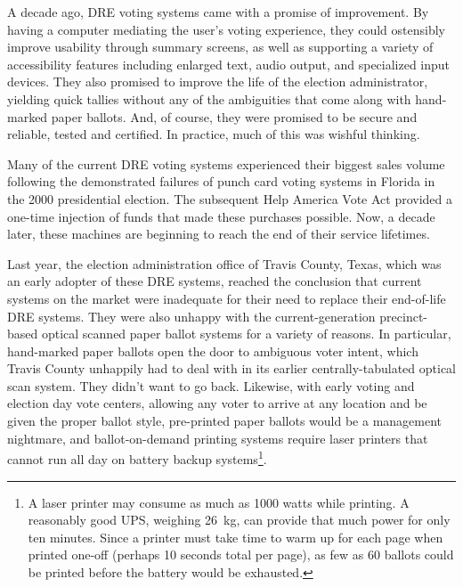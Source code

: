\label{sec:intro}

A decade ago, DRE voting systems came with a promise of improvement. By having a
computer mediating the user's voting experience, they could ostensibly
improve usability through summary screens, as well as supporting a
variety of accessibility features including enlarged text, audio
output, and specialized input devices. They also promised to improve
the life of the election administrator, yielding quick tallies without
any of the ambiguities that come along with hand-marked paper ballots.
And, of course, they were promised to be secure and reliable, tested
and certified. In practice, much of this was wishful thinking.

Many of the current DRE voting systems experienced their biggest sales
volume following the demonstrated failures of punch card voting
systems in Florida in the 2000 presidential election. The subsequent Help America Vote Act
provided a one-time injection of funds that made these purchases
possible. Now, a decade later, these machines are beginning to reach the end of
their service lifetimes. 

Last year, the election administration office of Travis County, Texas, which was an
early adopter of these DRE systems, reached the conclusion that current
systems on the market were inadequate for their need to replace their
end-of-life DRE systems. They were also unhappy with the
current-generation precinct-based optical scanned paper ballot systems
for a variety of reasons. In particular, hand-marked paper ballots
open the door to ambiguous voter intent, which Travis County unhappily
had to deal with in its earlier centrally-tabulated optical scan
system. They didn't want to go back. Likewise, with early
voting and election day vote centers, allowing any voter to arrive at
any location and be given the proper ballot style, pre-printed paper ballots would
be a management nightmare, and ballot-on-demand printing systems
require laser printers that cannot run all day on battery backup
systems\footnote{A laser printer may consume as much as 1000 watts
  while printing. A reasonably good UPS, weighing 26~kg, can provide
  that much power for only ten minutes. Since a printer must take time
  to warm up for each page when printed one-off (perhaps 10
  seconds total per page), as few as 60 ballots could be printed before the
  battery would be exhausted.}.

